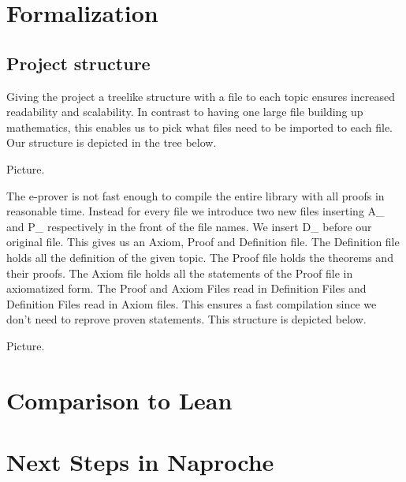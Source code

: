 \documentclass[11pt]{article}
\begin{document}
\newpage

\section{Formalization}
\subsection{Project structure}
Giving the project a treelike structure with a file to each topic ensures increased readability and scalability. In contrast to having one large file building up mathematics, this enables us to pick what files need to be imported to each file. Our structure is depicted in the tree below.

Picture.

The e-prover is not fast enough to compile the entire library with all proofs in reasonable time. Instead for every file we introduce two new files inserting A\_ and P\_ respectively in the front of the file names. We insert D\_ before our original file. This gives us an Axiom, Proof and Definition file. The Definition file holds all the definition of the given topic. The Proof file holds the theorems and their proofs. The Axiom file holds all the statements of the Proof file in axiomatized form. The Proof and Axiom Files read in Definition Files and Definition Files read in Axiom files. This ensures a fast compilation since we don't need to reprove proven statements. This structure is depicted below.

Picture.
\section{Comparison to Lean}


\section{Next Steps in Naproche}
\end{document}
